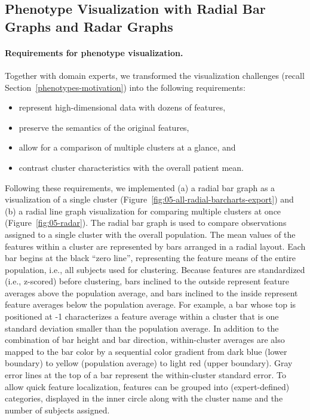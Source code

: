 \documentclass[
  oneside]{book}
\providecommand{\tightlist}{%
  \setlength{\itemsep}{0pt}\setlength{\parskip}{0pt}}
\begin{document}
\hypertarget{phenotypes-phenotyping-vis}{%
\subsection{Phenotype Visualization with Radial Bar Graphs and Radar Graphs}\label{phenotypes-phenotyping-vis}}

\paragraph*{Requirements for phenotype visualization.}

Together with domain experts, we transformed the visualization challenges (recall Section~\ref{phenotypes-motivation}) into the following requirements:

\begin{itemize}
\tightlist
\item
  represent high-dimensional data with dozens of features,
\item
  preserve the semantics of the original features,
\item
  allow for a comparison of multiple clusters at a glance, and
\item
  contrast cluster characteristics with the overall patient mean.
\end{itemize}

Following these requirements, we implemented (a) a radial bar graph as a visualization of a single cluster (Figure~\ref{fig:05-all-radial-barcharts-export}) and (b) a radial line graph visualization for comparing multiple clusters at once (Figure~\ref{fig:05-radar}).
The radial bar graph is used to compare observations assigned to a single cluster with the overall population.
The mean values of the features within a cluster are represented by bars arranged in a radial layout.
Each bar begins at the black ``zero line'', representing the feature means of the entire population, i.e., all subjects used for clustering.
Because features are standardized (i.e., z-scored) before clustering, bars inclined to the outside represent feature averages above the population average, and bars inclined to the inside represent feature averages below the population average.
For example, a bar whose top is positioned at -1 characterizes a feature average within a cluster that is one standard deviation smaller than the population average.
In addition to the combination of bar height and bar direction, within-cluster averages are also mapped to the bar color by a sequential color gradient from dark blue (lower boundary) to yellow (population average) to light red (upper boundary).
Gray error lines at the top of a bar represent the within-cluster standard error.
To allow quick feature localization, features can be grouped into (expert-defined) categories, displayed in the inner circle along with the cluster name and the number of subjects assigned.
\end{document}
